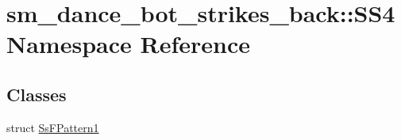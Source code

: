 \hypertarget{namespacesm__dance__bot__strikes__back_1_1SS4}{}\section{sm\+\_\+dance\+\_\+bot\+\_\+strikes\+\_\+back\+:\+:S\+S4 Namespace Reference}
\label{namespacesm__dance__bot__strikes__back_1_1SS4}
\subsection*{Classes}
\begin{DoxyCompactItemize}
\item 
struct \hyperlink{structsm__dance__bot__strikes__back_1_1SS4_1_1SsFPattern1}{Ss\+F\+Pattern1}
\end{DoxyCompactItemize}
